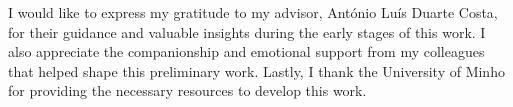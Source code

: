 
%

\begin{ntacknowledgements}

I would like to express my gratitude to my advisor, António Luís Duarte Costa, for their guidance and valuable insights during the early stages of this work.
I also appreciate the companionship and emotional support from my colleagues that helped shape this preliminary work.    
Lastly, I thank the University of Minho for providing the necessary resources to develop this work.

\end{ntacknowledgements}